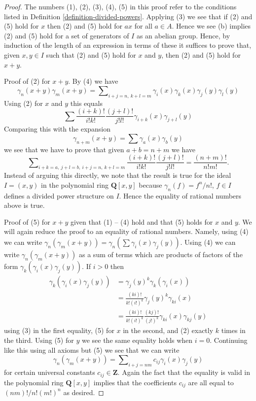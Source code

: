 \documentclass{stacks-project}
\theoremstyle{plain}
\theoremstyle{definition}
\theoremstyle{remark}
\numberwithin{equation}{subsection}
\begin{document}
\begin{proof}
The numbers (1), (2), (3), (4), (5) in this proof refer to the
conditions listed in Definition \ref{definition-divided-powers}.
Applying (3) we see that if (2) and (5) hold for $x$ then (2) and (5)
hold for $ax$ for all $a \in A$. Hence we see (b) implies
(2) and (5) hold for a set of generators
of $I$ as an abelian group. Hence, by induction of the length
of an expression in terms of these it suffices to prove that, given
$x, y \in I$ such that (2) and (5) hold for $x$ and $y$, then (2) and (5) hold
for $x + y$.

\medskip\noindent
Proof of (2) for $x + y$. By (4) we have
$$
\gamma_n(x + y)\gamma_m(x + y) =
\sum\nolimits_{i + j = n,\ k + l = m}
\gamma_i(x)\gamma_k(x)\gamma_j(y)\gamma_l(y)
$$
Using (2) for $x$ and $y$ this equals
$$
\sum \frac{(i + k)!}{i!k!}\frac{(j + l)!}{j!l!}
\gamma_{i + k}(x)\gamma_{j + l}(y)
$$
Comparing this with the expansion
$$
\gamma_{n + m}(x + y) = \sum \gamma_a(x)\gamma_b(y)
$$
we see that we have to prove that given $a + b = n + m$ we have
$$
\sum\nolimits_{i + k = a,\ j + l = b,\ i + j = n,\ k + l = m}
\frac{(i + k)!}{i!k!}\frac{(j + l)!}{j!l!}
=
\frac{(n + m)!}{n!m!}.
$$
Instead of arguing this directly, we note that the result is true
for the ideal $I = (x, y)$ in the polynomial ring $\mathbf{Q}[x, y]$
because $\gamma_n(f) = f^n/n!$, $f \in I$ defines a divided power
structure on $I$. Hence the equality of rational numbers above is true.

\medskip\noindent
Proof of (5) for $x + y$ given that (1) -- (4) hold and that (5)
holds for $x$ and $y$. We will again reduce the proof to an equality
of rational numbers. Namely, using (4) we can write
$\gamma_n(\gamma_m(x + y)) = \gamma_n(\sum \gamma_i(x)\gamma_j(y))$.
Using (4) we can write
$\gamma_n(\gamma_m(x + y))$ as a sum of terms which are products of
factors of the form $\gamma_k(\gamma_i(x)\gamma_j(y))$.
If $i > 0$ then
\begin{align*}
\gamma_k(\gamma_i(x)\gamma_j(y)) & =
\gamma_j(y)^k\gamma_k(\gamma_i(x)) \\
& = \frac{(ki)!}{k!(i!)^k} \gamma_j(y)^k \gamma_{ki}(x) \\
& =
\frac{(ki)!}{k!(i!)^k} \frac{(kj)!}{(j!)^k} \gamma_{ki}(x) \gamma_{kj}(y)
\end{align*}
using (3) in the first equality, (5) for $x$ in the second, and
(2) exactly $k$ times in the third. Using (5) for $y$ we see the
same equality holds when $i = 0$. Continuing like this using all
axioms but (5) we see that we can write
$$
\gamma_n(\gamma_m(x + y)) =
\sum\nolimits_{i + j = nm} c_{ij}\gamma_i(x)\gamma_j(y)
$$
for certain universal constants $c_{ij} \in \mathbf{Z}$. Again the fact
that the equality is valid in the polynomial ring $\mathbf{Q}[x, y]$
implies that the coefficients $c_{ij}$ are all equal to $(nm)!/n!(m!)^n$
as desired.
\end{proof}
\end{document}
